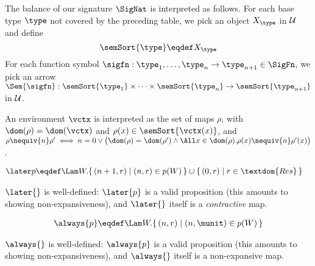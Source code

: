 The balance of our signature $\SigNat$ is interpreted as follows.
For each base type $\type$ not covered by the preceding table, we pick an object $X_\type$ in $\cal U$ and define
\[
\semSort{\type} \eqdef X_\type
\]
For each function symbol $\sigfn : \type_1, \dots, \type_n \to \type_{n+1} \in \SigFn$, we pick an arrow $\Sem{\sigfn} : \semSort{\type_1} \times \dots \times \semSort{\type_n} \to \semSort{\type_{n+1}}$ in $\cal U$.

An environment $\vctx$ is interpreted as the set of
maps $\rho$, with $\dom(\rho) = \dom(\vctx)$ and
$\rho(x)\in\semSort{\vctx(x)}$,
and 
$\rho\nequiv{n} \rho' \iff n=0 \lor \bigl(\dom(\rho)=\dom(\rho') \land
\All x\in\dom(\rho). \rho(x) \nequiv{n} \rho'(x)\bigr)$.

%


\begin{align*}
	\later p &\eqdef \Lam W. \{\, (n + 1, r) \mid (n, r) \in p(W) \,\} \cup \{\, (0, r) \mid r \in \textdom{Res} \,\}
\end{align*}
\begin{lem}
	$\later{}$ is well-defined: $\later {p}$ is a valid proposition (this amounts to showing non-expansiveness), and $\later{}$ itself is a \emph{contractive} map.
\end{lem}


\begin{align*}
	\always{p} \eqdef \Lam W. \{\, (n, r) \mid (n, \munit) \in p(W) \,\}
\end{align*}
\begin{lem}
	$\always{}$ is well-defined: $\always{p}$ is a valid proposition (this amounts to showing non-expansiveness), and $\always{}$ itself is a non-expansive map.
\end{lem}


